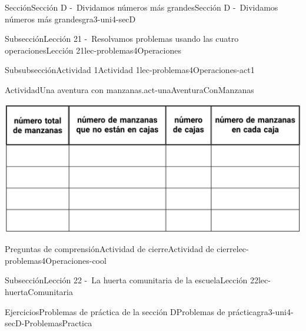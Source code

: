 \begin{sectionptx}{Sección}{Sección D -~Dividamos números más grandes}{}{Sección D -~Dividamos números más grandes}{}{}{gra3-uni4-secD}
\begin{subsectionptx}{Subsección}{Lección 21 -~Resolvamos problemas usando las cuatro operaciones}{}{Lección 21}{}{}{lec-problemas4Operaciones}
\begin{subsubsectionptx}{Subsubsección}{Actividad 1}{}{Actividad 1}{}{}{lec-problemas4Operaciones-act1}
\begin{activity}{Actividad}{Una aventura con manzanas.}{act-unaAventuraConManzanas}
\begin{image}{0}{1}{0}{}
\end{image}%
\begin{image}{0}{1}{0}{}%
\includegraphics[max width=\linewidth, center]{external/tikz-source/3-4-21-act1-BLM-table.pdf}
\end{image}%
\end{activity}%
\end{subsubsectionptx}
%
%
\typeout{************************************************}
\typeout{************************************************}
%
\begin{reading-questions-subsubsection}{Preguntas de comprensión}{Actividad de cierre}{}{Actividad de cierre}{}{}{lec-problemas4Operaciones-cool}
%
\end{reading-questions-subsubsection}
\end{subsectionptx}
%
%
\typeout{************************************************}
\typeout{************************************************}
%
\begin{subsectionptx}{Subsección}{Lección 22 -~La huerta comunitaria de la escuela}{}{Lección 22}{}{}{lec-huertaComunitaria}
\end{subsectionptx}
%
%
\typeout{************************************************}
\typeout{************************************************}
%
\begin{exercises-subsection}{Ejercicios}{Problemas de práctica de la sección D}{}{Problemas de práctica}{}{}{gra3-uni4-secD-ProblemasPractica}
%
%
%
%
%
%
%
\end{exercises-subsection}
\end{sectionptx}
%
%
\typeout{************************************************}
\typeout{************************************************}
